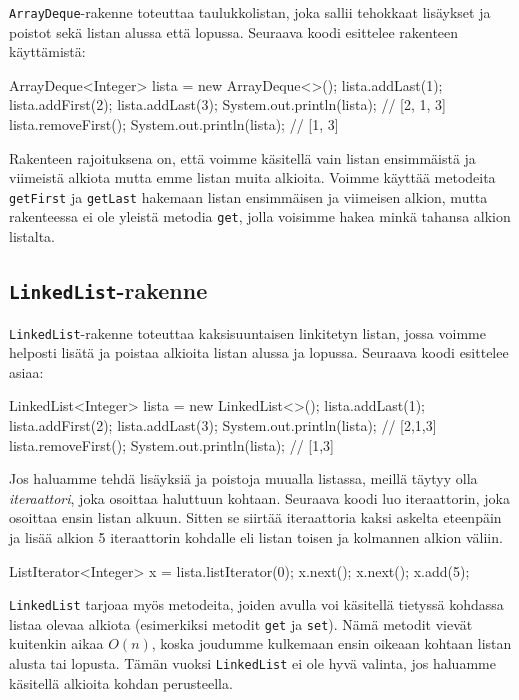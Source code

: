 \texttt{ArrayDeque}-rakenne toteuttaa taulukkolistan,
joka sallii tehokkaat lisäykset ja poistot
sekä listan alussa että lopussa.
Seuraava koodi esittelee rakenteen käyttämistä:

\begin{code}
ArrayDeque<Integer> lista = new ArrayDeque<>();
lista.addLast(1);
lista.addFirst(2);
lista.addLast(3);
System.out.println(lista); // [2, 1, 3]
lista.removeFirst();
System.out.println(lista); // [1, 3]
\end{code}

Rakenteen rajoituksena on, että voimme käsitellä
vain listan ensimmäistä ja viimeistä alkiota mutta
emme listan muita alkioita.
Voimme käyttää metodeita \texttt{getFirst} ja \texttt{getLast}
hakemaan listan ensimmäisen ja viimeisen alkion,
mutta rakenteessa ei ole yleistä metodia \texttt{get},
jolla voisimme hakea minkä tahansa alkion listalta.

\subsection{\texttt{LinkedList}-rakenne}

\texttt{LinkedList}-rakenne toteuttaa kaksisuuntaisen
linkitetyn listan, jossa voimme helposti lisätä ja poistaa
alkioita listan alussa ja lopussa.
Seuraava koodi esittelee asiaa:

\begin{code}
LinkedList<Integer> lista = new LinkedList<>();
lista.addLast(1);
lista.addFirst(2);
lista.addLast(3);
System.out.println(lista); // [2,1,3]
lista.removeFirst();
System.out.println(lista); // [1,3]
\end{code}

Jos haluamme tehdä lisäyksiä ja poistoja muualla listassa,
meillä täytyy olla \emph{iteraattori}, joka osoittaa haluttuun kohtaan.
Seuraava koodi luo iteraattorin, joka osoittaa ensin listan alkuun.
Sitten se siirtää iteraattoria kaksi askelta eteenpäin ja
lisää alkion 5 iteraattorin kohdalle eli listan
toisen ja kolmannen alkion väliin.

\begin{code}
ListIterator<Integer> x = lista.listIterator(0);
x.next();
x.next();
x.add(5);
\end{code}

\texttt{LinkedList} tarjoaa myös metodeita,
joiden avulla voi käsitellä tietyssä kohdassa listaa olevaa alkiota
(esimerkiksi metodit \texttt{get} ja \texttt{set}).
Nämä metodit vievät kuitenkin aikaa $O(n)$,
koska joudumme kulkemaan ensin oikeaan kohtaan listan
alusta tai lopusta.
Tämän vuoksi \texttt{LinkedList} ei ole hyvä valinta,
jos haluamme käsitellä alkioita kohdan perusteella.

